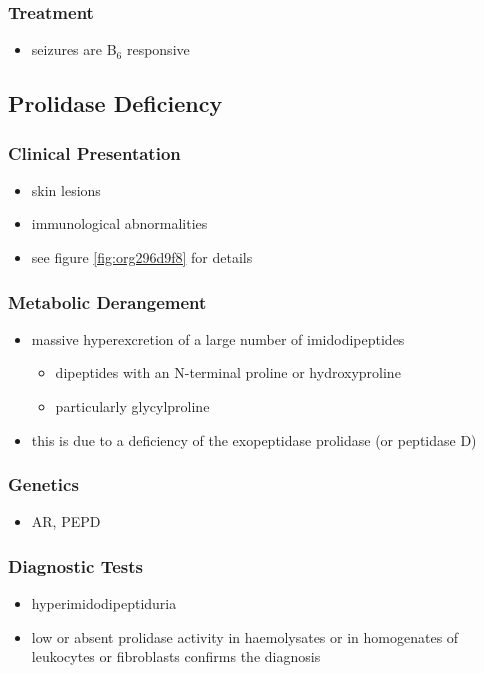 \documentclass{scrartcl}
\begin{document}
\subsubsection{Treatment}
\label{sec:orgd3e0bd3}
\begin{itemize}
\item seizures are B\(_{\text{6}}\) responsive
\end{itemize}

\subsection{Prolidase Deficiency}
\label{sec:org236f512}
\subsubsection{Clinical Presentation}
\label{sec:orgc386613}
\begin{itemize}
\item skin lesions
\item immunological abnormalities
\item see figure \ref{fig:org296d9f8} for details
\end{itemize}
\subsubsection{Metabolic Derangement}
\label{sec:org084348d}
\begin{itemize}
\item massive hyperexcretion of a large number of imidodipeptides
\begin{itemize}
\item dipeptides with an N-terminal proline or hydroxyproline
\item particularly glycylproline
\end{itemize}
\item this is due to a deficiency of the exopeptidase prolidase (or
peptidase D)
\end{itemize}
\subsubsection{Genetics}
\label{sec:org0e4a513}
\begin{itemize}
\item AR, PEPD
\end{itemize}
\subsubsection{Diagnostic Tests}
\label{sec:org6dff661}
\begin{itemize}
\item hyperimidodipeptiduria
\item low or absent prolidase activity in haemolysates or in homogenates
of leukocytes or fibroblasts confirms the diagnosis
\end{itemize}
\end{document}
